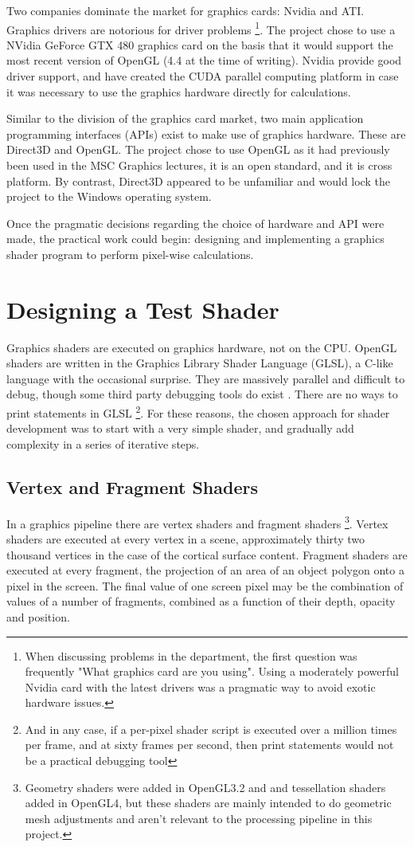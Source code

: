 \documentclass[MSc,paper=a4,pagesize=auto]{icldt}
\begin{document}
Two companies dominate the market for graphics cards: Nvidia and ATI. Graphics drivers are notorious for driver problems \footnote{When discussing problems in the department, the first question was frequently "What graphics card are you using". Using a moderately powerful Nvidia card with the latest drivers was a pragmatic way to avoid exotic hardware issues.}. The project chose to use a NVidia GeForce GTX 480 graphics card on the basis that it would support the most recent version of OpenGL (4.4 at the time of writing). Nvidia provide good driver support, and have created the CUDA parallel computing platform in case it was necessary to use the graphics hardware directly for calculations.

Similar to the division of the graphics card market, two main application programming interfaces (APIs) exist to make use of graphics hardware. These are Direct3D and OpenGL. The project chose to use OpenGL as it had previously been used in the MSC Graphics lectures, it is an open standard, and it is cross platform. By contrast, Direct3D appeared to be unfamiliar and would lock the project to the Windows operating system.

Once the pragmatic decisions regarding the choice of hardware and API were made, the practical work could begin: designing and implementing a graphics shader program to perform pixel-wise calculations.

\section{Designing a Test Shader}
Graphics shaders are executed on graphics hardware, not on the CPU. OpenGL shaders are written in the Graphics Library Shader Language (GLSL), a C-like language with the occasional surprise. They are massively parallel and difficult to debug, though some third party debugging tools do exist \cite{glslDevil}. There are no ways to print statements in GLSL \footnote{And in any case, if a per-pixel shader script is executed over a million times per frame, and at sixty frames per second, then print statements would not be a practical debugging tool}. For these reasons, the chosen approach for shader development was to start with a very simple shader, and gradually add complexity in a series of iterative steps. 

\subsection{Vertex and Fragment Shaders}
In a graphics pipeline there are vertex shaders and fragment shaders \footnote{Geometry shaders were added in OpenGL3.2 and and tessellation shaders added in OpenGL4, but these shaders are mainly intended to do geometric mesh adjustments and aren't relevant to the processing pipeline in this project.}. Vertex shaders are executed at every vertex in a scene, approximately thirty two thousand vertices in the case of the cortical surface content. Fragment shaders are executed at every fragment, the projection of an area of an object polygon onto a pixel in the screen. The final value of one screen pixel may be the combination of values of a number of fragments, combined as a function of their depth, opacity and position.
\end{document}
